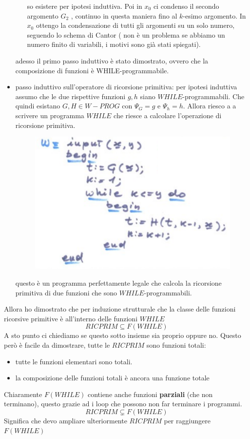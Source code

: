 \documentclass{article}
\begin{document}
\begin{itemize}
\begin{itemize}
                    so esistere per ipotesi induttiva. Poi in $x_0$ ci condenso il secondo argomento
                    $G_2$ , continuo in questa maniera fino al $k$-esimo argomento. In $x_0$ ottengo la
                    condensazione di tutti gli argomenti su un solo numero, seguendo lo schema di Cantor (
                    non è un problema se abbiamo un numero finito di variabili, i motivi sono già stati spiegati).
          \end{itemize}
          adesso il primo passo induttivo è stato dimostrato, ovvero che la composizione di funzioni
          è WHILE-programmabile.
    \item passo induttivo sull'operatore di ricorsione primitiva: per ipotesi induttiva
          assumo che le due rispettive funzioni $g,h$ siano $WHILE$-programmabili.
          Che quindi esistano $G,H\in W-PROG$ con $\Psi_G=g$ e $\Psi_h=h$.
          Allora riesco a
          a scrivere un programma $WHILE$ che riesce a calcolare l'operazione di ricorsione primitiva.
          \begin{figure}[H]
              \centering
              \includegraphics[scale=0.5]{images/while-rico.png}
          \end{figure}
          questo è un programma perfettamente legale che calcola la ricorsione primitiva di due funzioni
          che sono $WHILE$-programmabili.
\end{itemize}
Allora ho dimostrato che per induzione strutturale che la classe delle funzioni ricorsive primitive
è all'interno delle funzioni $WHILE$
$$RICPRIM\subseteq F(WHILE)$$
A sto punto ci chiediamo se questo sotto insieme sia proprio oppure no. Questo però è facile
da dimostrare, tutte le $RICPRIM$ sono funzioni totali:
\begin{itemize}
    \item tutte le funzioni elementari sono totali.
    \item la composizione delle funzioni totali è ancora una funzione totale
\end{itemize}
Chiaramente $F(WHILE)$ contiene anche funzioni \textbf{parziali} (che non terminano),
questo grazie ad i loop che possono non far terminare i programmi.
$$RICPRIM\subsetneq F(WHILE)$$
Significa che devo ampliare ulteriormente $RICPRIM$ per raggiungere $F(WHILE)$
\end{document}
